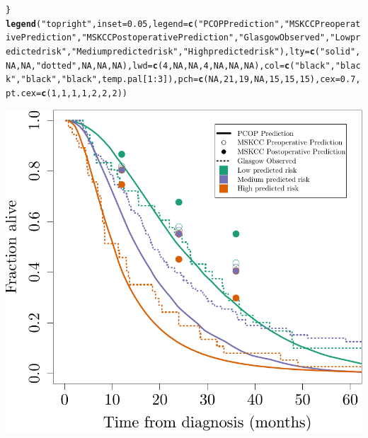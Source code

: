 \documentclass{article}\usepackage[]{graphicx}\usepackage[]{color}
\makeatletter
\def\maxwidth{ %
  \ifdim\Gin@nat@width>\linewidth
    \linewidth
  \else
    \Gin@nat@width
  \fi
}
\newcommand{\hlnum}[1]{\textcolor[rgb]{0.686,0.059,0.569}{#1}}%
\newcommand{\hlstr}[1]{\textcolor[rgb]{0.192,0.494,0.8}{#1}}%
\newcommand{\hlopt}[1]{\textcolor[rgb]{0,0,0}{#1}}%
\newcommand{\hlstd}[1]{\textcolor[rgb]{0.345,0.345,0.345}{#1}}%
\newcommand{\hlkwc}[1]{\textcolor[rgb]{0.333,0.667,0.333}{#1}}%
\newcommand{\hlkwd}[1]{\textcolor[rgb]{0.737,0.353,0.396}{\textbf{#1}}}%
\newenvironment{kframe}{%
 \def\at@end@of@kframe{}%
 \ifinner\ifhmode%
  \def\at@end@of@kframe{\end{minipage}}%
  \begin{minipage}{\columnwidth}%
 \fi\fi%
 \def\FrameCommand##1{\hskip\@totalleftmargin \hskip-\fboxsep
 \colorbox{shadecolor}{##1}\hskip-\fboxsep
     \hskip-\linewidth \hskip-\@totalleftmargin \hskip\columnwidth}%
 \MakeFramed {\advance\hsize-\width
   \@totalleftmargin\z@ \linewidth\hsize
   \@setminipage}}%
 {\par\unskip\endMakeFramed%
 \at@end@of@kframe}
\newenvironment{knitrout}{}{} %
\makeatother
\begin{document}
\begin{knitrout}
\begin{kframe}
\begin{alltt}
\hlstd{\}}
\hlkwd{legend}\hlstd{(}\hlstr{"topright"}\hlstd{,} \hlkwc{inset} \hlstd{=} \hlnum{0.05}\hlstd{,} \hlkwc{legend} \hlstd{=} \hlkwd{c}\hlstd{(}\hlstr{"PCOP Prediction"}\hlstd{,} \hlstr{"MSKCC Preoperative Prediction"}\hlstd{,} \hlstr{"MSKCC Postoperative Prediction"}\hlstd{,} \hlstr{"Glasgow Observed"}\hlstd{,} \hlstr{"Low predicted risk"}\hlstd{,} \hlstr{"Medium predicted risk"}\hlstd{,} \hlstr{"High predicted risk"}\hlstd{),} \hlkwc{lty} \hlstd{=} \hlkwd{c}\hlstd{(}\hlstr{"solid"}\hlstd{,} \hlnum{NA}\hlstd{,} \hlnum{NA}\hlstd{,} \hlstr{"dotted"}\hlstd{,} \hlnum{NA}\hlstd{,} \hlnum{NA}\hlstd{,} \hlnum{NA}\hlstd{),} \hlkwc{lwd} \hlstd{=} \hlkwd{c}\hlstd{(}\hlnum{4}\hlstd{,} \hlnum{NA}\hlstd{,} \hlnum{NA}\hlstd{,} \hlnum{4}\hlstd{,} \hlnum{NA}\hlstd{,} \hlnum{NA}\hlstd{,} \hlnum{NA}\hlstd{),} \hlkwc{col} \hlstd{=} \hlkwd{c}\hlstd{(}\hlstr{"black"}\hlstd{,} \hlstr{"black"}\hlstd{,} \hlstr{"black"}\hlstd{,} \hlstr{"black"}\hlstd{, temp.pal[}\hlnum{1}\hlopt{:}\hlnum{3}\hlstd{]),} \hlkwc{pch} \hlstd{=} \hlkwd{c}\hlstd{(}\hlnum{NA}\hlstd{,} \hlnum{21}\hlstd{,} \hlnum{19}\hlstd{,} \hlnum{NA}\hlstd{,} \hlnum{15}\hlstd{,} \hlnum{15}\hlstd{,} \hlnum{15}\hlstd{),} \hlkwc{cex} \hlstd{=} \hlnum{0.7}\hlstd{,} \hlkwc{pt.cex} \hlstd{=} \hlkwd{c}\hlstd{(}\hlnum{1}\hlstd{,} \hlnum{1}\hlstd{,} \hlnum{1}\hlstd{,} \hlnum{1}\hlstd{,} \hlnum{2}\hlstd{,} \hlnum{2}\hlstd{,} \hlnum{2}\hlstd{))}
\end{alltt}
\end{kframe}

{\centering \includegraphics[width=\maxwidth]{figure/07-altman-4-glasgow-1} 

}
\end{knitrout}
\end{document}
